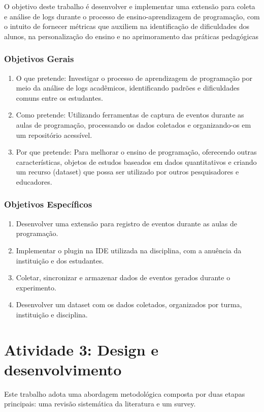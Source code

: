 \documentclass[12pt,a4paper]{article}
\begin{document}
	O objetivo deste trabalho é desenvolver e implementar uma extensão para coleta e análise de logs durante o processo de ensino-aprendizagem de programação, com o intuito de fornecer métricas que auxiliem na identificação de dificuldades dos alunos, na personalização do ensino e no aprimoramento das práticas pedagógicas
	
	\subsubsection{Objetivos Gerais}
	\begin{enumerate}
		\item O que pretende: Investigar o processo de aprendizagem de programação por meio da análise de logs acadêmicos, identificando padrões e dificuldades comuns entre os estudantes.
		\item Como pretende: Utilizando ferramentas de captura de eventos durante as aulas de programação, processando os dados coletados e organizando-os em um repositório acessível.
		\item Por que pretende: Para melhorar o ensino de programação, oferecendo outras características, objetos de estudos baseados em dados quantitativos e criando um recurso (dataset) que possa ser utilizado por outros pesquisadores e educadores.
	\end{enumerate}
	\subsubsection{Objetivos Específicos}
	\begin{enumerate}
	\item Desenvolver uma extensão para registro de eventos durante as aulas de programação.
	\item Implementar o plugin na IDE utilizada na disciplina, com a anuência da instituição e dos estudantes.
	\item Coletar, sincronizar e armazenar dados de eventos gerados durante o experimento.
	\item Desenvolver um dataset com os dados coletados, organizados por turma, instituição e disciplina.
\end{enumerate}
	
	\section{Atividade 3: Design e desenvolvimento}
	
	Este trabalho adota uma abordagem metodológica composta por duas etapas principais: uma revisão sistemática da literatura e um survey.
	
\end{document}
